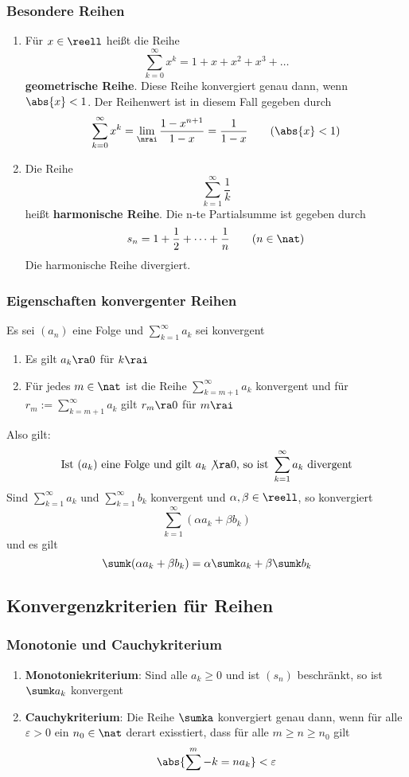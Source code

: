 \documentclass{kit}
\newcommand\f{(a_n)}
\begin{document}
    \subsubsection{Besondere Reihen}
      \begin{enumerate}
        \item Für $x\in\reell$ heißt die Reihe
        $$\sum^\infty_{k=0}x^k=1+x+x^2+x^3+\dots$$
        \textbf{geometrische Reihe}. Diese Reihe konvergiert genau dann, wenn $\abs{x}<1$. Der Reihenwert ist in diesem Fall gegeben durch
        $$\sum^\infty_{k=0}x^k=\lim_\nrai\frac{1-x^{n+1}}{1-x}=\frac{1}{1-x}\qquad(\abs{x}<1)$$
      \item Die Reihe
        $$\sum^\infty_{k=1}\frac{1}{k}$$
        heißt \textbf{harmonische Reihe}. Die n-te Partialsumme ist gegeben  durch
      $$s_n=1+\frac{1}{2}+\dots+\frac{1}{n}\qquad (n\in\nat)$$
      Die harmonische Reihe divergiert.
      \end{enumerate}
    \subsubsection{Eigenschaften konvergenter Reihen}
      Es sei $\f$ eine Folge und $\sum^\infty_{k=1}a_k$ sei konvergent
      \begin{enumerate}
        \item Es gilt $a_k\ra0$ für $k\rai$
        \item Für jedes $m\in\nat$ ist die Reihe $\sum^\infty_{k=m+1}a_k$ konvergent und für $r_m:=\sum^\infty_{k=m+1}a_k$ gilt $r_m\ra0$ für $m\rai$
      \end{enumerate}
      Also gilt:
      $$\text{Ist }(a_k)\text{ eine Folge und gilt }a_k\not\ra0\text{, so ist }\sum^\infty_{k=1}a_k\text{ divergent}$$
      Sind $\sum^\infty_{k=1}a_k$ und $\sum^\infty_{k=1}b_k$ konvergent und $\alpha,\beta\in\reell$, so konvergiert
      $$\sum^\infty_{k=1}(\alpha a_k+\beta b_k)$$
      und es gilt 
      $$\sumk(\alpha a_k+\beta b_k)=\alpha\sumk a_k+\beta\sumk b_k$$
  \subsection{Konvergenzkriterien für Reihen}
    \subsubsection{Monotonie und Cauchykriterium}
      \begin{enumerate}
        \item \textbf{Monotoniekriterium}: Sind alle $a_k\ge0$ und ist $(s_n)$ beschränkt, so ist $\sumk a_k$ konvergent
        \item \textbf{Cauchykriterium}: Die Reihe $\sumka$ konvergiert genau dann, wenn für alle $\varepsilon>0$ ein $n_0\in\nat$ derart exisstiert, dass für alle $m\ge n\ge n_0$ gilt
          $$\abs{\sum^m-{k=n}a_k}<\varepsilon$$
      \end{enumerate}
\end{document}
